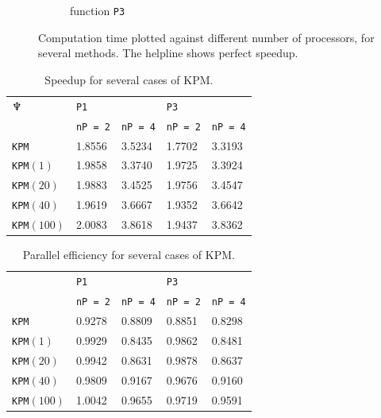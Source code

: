\begin{figure}[H]
\begin{subfigure}[b]{0.45\textwidth}
                \caption{function \texttt{P3}}
                \label{fig:speed2}
        \end{subfigure}
        \caption{Computation time plotted against different number of processors, for several methods. The helpline shows perfect speedup.}\label{fig:speed}

\end{figure}

\begin{table}[H]
\centering
\begin{tabular}{l | l l | l l}
$\neptune$ %
 &\texttt{P1} & & \texttt{P3} & \\
&\texttt{nP = 2} & \texttt{nP = 4} & \texttt{nP = 2} & \texttt{nP = 4} \\
\hline
\texttt{KPM} & 1.8556  &  3.5234 & 1.7702&    3.3193\\
\texttt{KPM}$(1)$ & 1.9858  &  3.3740 & 1.9725&    3.3924\\
\texttt{KPM}$(20)$ & 1.9883  &  3.4525 & 1.9756&    3.4547\\
\texttt{KPM}$(40)$ & 1.9619  &  3.6667 & 1.9352&   3.6642\\
\texttt{KPM}$(100)$ & 2.0083  &  3.8618 & 1.9437&    3.8362\\
\end{tabular}
\caption{Speedup for several cases of KPM.}
\label{tab:speedup}
\end{table}

\begin{table}[H]
\centering
\begin{tabular}{l | l l | l l}
&\texttt{P1} & & \texttt{P3} & \\
&\texttt{nP = 2} & \texttt{nP = 4} & \texttt{nP = 2} & \texttt{nP = 4} \\
\hline
\texttt{KPM} & 0.9278  &  0.8809 & 0.8851&    0.8298\\
\texttt{KPM}$(1)$ &  0.9929  &  0.8435 & 0.9862 &   0.8481\\
\texttt{KPM}$(20)$ & 0.9942  &  0.8631 & 0.9878&    0.8637\\
\texttt{KPM}$(40)$ & 0.9809  &  0.9167 & 0.9676&    0.9160\\
\texttt{KPM}$(100)$ & 1.0042  &  0.9655 & 0.9719&    0.9591\\
\end{tabular}
\caption{Parallel efficiency for several cases of KPM. }
\label{tab:eff}
\end{table}

